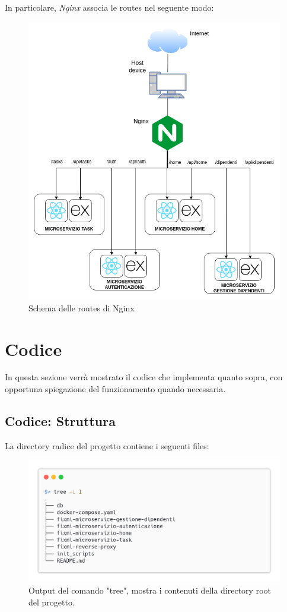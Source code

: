 \documentclass{report}
\begin{document}
In particolare, \textit{Nginx} associa le routes nel seguente modo:
\begin{figure}[H]
	\centering\includegraphics[width=1\textwidth]{images/nginx.png}
	Schema delle routes di Nginx
\end{figure}

\section{Codice}
In questa sezione verrà mostrato il codice che implementa quanto sopra, con opportuna spiegazione del funzionamento quando necessaria.

\subsection{Codice: Struttura}

La directory radice del progetto contiene i seguenti files:

\begin{figure}[H]
	\centering\includegraphics[width=1\textwidth]{images/tree.png}
	Output del comando "tree", mostra i contenuti della directory root del progetto.
\end{figure}
\end{document}

